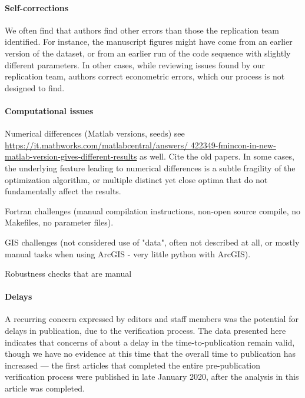 \documentclass[PP]{AEA}
\begin{document}
\paragraph{Self-corrections}

We often find that authors find other errors than those the replication team identified. For instance, the manuscript figures might have come from an earlier version of the dataset, or from an earlier run of the code sequence with slightly different parameters. In other cases, while reviewing issues found by our replication team, authors correct econometric errors, which our process is not designed to find. 

\paragraph{Computational issues}

Numerical differences (Matlab versions, seeds) see \url{https://it.mathworks.com/matlabcentral/answers/
422349-fmincon-in-new-matlab-version-gives-different-results} as well. Cite the old papers. In some cases, the underlying feature leading to numerical differences is a subtle fragility of the optimization algorithm, or multiple distinct yet close optima that do not fundamentally affect the results.

Fortran challenges (manual compilation instructions, non-open source compile, no Makefiles, no parameter files).

GIS challenges (not considered use of "data", often not described at all, or mostly manual tasks when using ArcGIS - very little python with ArcGIS). 

Robustness checks that are manual

\paragraph{Delays} A recurring concern expressed by editors and staff members was the potential for   delays in publication, due to the verification process. The data presented here indicates that concerns of about a delay in the time-to-publication remain valid, though we have no evidence at this time that the overall time to publication has increased --- the first articles that completed the entire pre-publication verification process were published in late January 2020, after the analysis in this article was completed.
\end{document}
